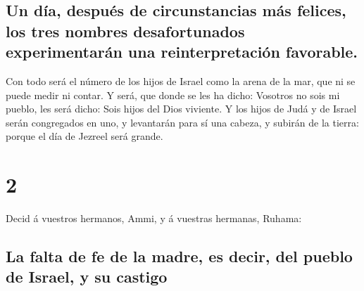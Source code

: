 \hypertarget{un-duxeda-despuuxe9s-de-circunstancias-muxe1s-felices-los-tres-nombres-desafortunados-experimentaruxe1n-una-reinterpretaciuxf3n-favorable.}{%
\subsection{Un día, después de circunstancias más felices, los tres
nombres desafortunados experimentarán una reinterpretación
favorable.}\label{un-duxeda-despuuxe9s-de-circunstancias-muxe1s-felices-los-tres-nombres-desafortunados-experimentaruxe1n-una-reinterpretaciuxf3n-favorable.}}

 Con todo será el número de los hijos de Israel como la
arena de la mar, que ni se puede medir ni contar. Y será, que donde se
les ha dicho: Vosotros no sois mi pueblo, les será dicho: Sois hijos del
Dios viviente.  Y los hijos de Judá y de Israel serán
congregados en uno, y levantarán para sí una cabeza, y subirán de la
tierra: porque el día de Jezreel será grande.

\hypertarget{section-1}{%
\section{2}\label{section-1}}

 Decid á vuestros hermanos, Ammi, y á vuestras hermanas,
Ruhama:

\hypertarget{la-falta-de-fe-de-la-madre-es-decir-del-pueblo-de-israel-y-su-castigo}{%
\subsection{La falta de fe de la madre, es decir, del pueblo de Israel,
y su
castigo}\label{la-falta-de-fe-de-la-madre-es-decir-del-pueblo-de-israel-y-su-castigo}}

